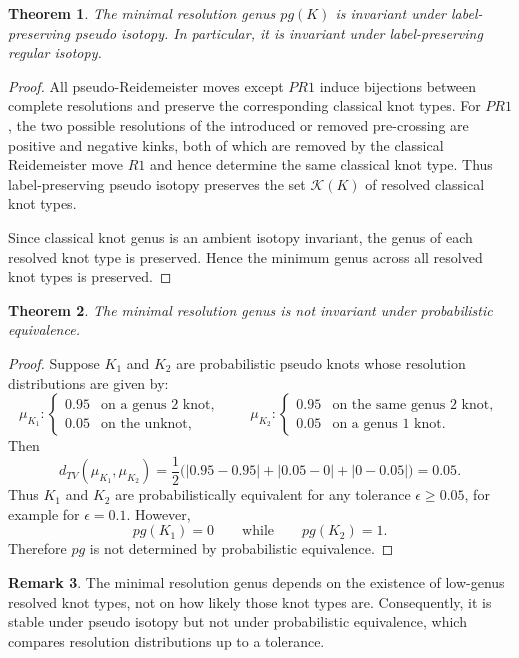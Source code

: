 \documentclass[a4paper, reqno, 12pt]{amsart}
\theoremstyle{plain}
\newtheorem{theorem}{Theorem}[section]
\theoremstyle{definition}
\newtheorem{remark}[theorem]{Remark}
\begin{document}
\begin{theorem}
The minimal resolution genus \(pg(K)\) is invariant under label-preserving pseudo isotopy. In particular, it is invariant under label-preserving regular isotopy.
\end{theorem}

\begin{proof}
All pseudo-Reidemeister moves except \(PR1\) induce bijections between complete resolutions and preserve the corresponding classical knot types. For \(PR1\), the two possible resolutions of the introduced or removed pre-crossing are positive and negative kinks, both of which are removed by the classical Reidemeister move \(R1\) and hence determine the same classical knot type. Thus label-preserving pseudo isotopy preserves the set \(\mathcal K(K)\) of resolved classical knot types.

Since classical knot genus is an ambient isotopy invariant, the genus of each resolved knot type is preserved. Hence the minimum genus across all resolved knot types is preserved.
\end{proof}

\begin{theorem}
The minimal resolution genus is not invariant under probabilistic equivalence.
\end{theorem}

\begin{proof}
Suppose \(K_1\) and \(K_2\) are probabilistic pseudo knots whose resolution distributions are given by:
\[
\mu_{K_1}:
\begin{cases}
0.95 & \text{on a genus \(2\) knot},\\
0.05 & \text{on the unknot},
\end{cases}
\qquad
\mu_{K_2}:
\begin{cases}
0.95 & \text{on the same genus \(2\) knot},\\
0.05 & \text{on a genus \(1\) knot}.
\end{cases}
\]
Then
\[
d_{TV}(\mu_{K_1},\mu_{K_2})
=
\frac{1}{2}
\Big(
|0.95-0.95|
+
|0.05-0|
+
|0-0.05|
\Big)
=
0.05.
\]
Thus \(K_1\) and \(K_2\) are probabilistically equivalent for any tolerance \(\epsilon\ge 0.05\), for example for \(\epsilon=0.1\). However,
\[
pg(K_1)=0
\qquad
\text{while}
\qquad
pg(K_2)=1.
\]
Therefore \(pg\) is not determined by probabilistic equivalence.
\end{proof}

\begin{remark}\rm
The minimal resolution genus depends on the existence of low-genus resolved knot types, not on how likely those knot types are. Consequently, it is stable under pseudo isotopy but not under probabilistic equivalence, which compares resolution distributions up to a tolerance.
\end{remark}
\end{document}
